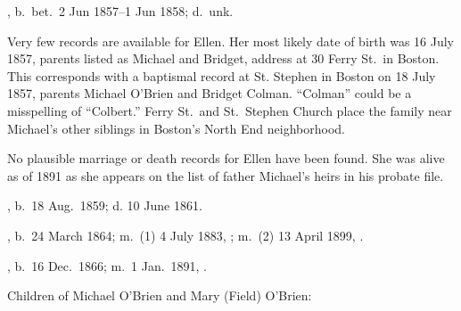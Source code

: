\begin{Kids}
	
	, b.\ bet.\ 2 Jun 1857--1 Jun 1858;\cite{Census1870Ellen3OBrien2,Census1880Ellen3OBrien2} d.\ unk.
	
	\begin{KidsMoreText}
		Very few records are available for Ellen. Her most likely date of birth was 16 July 1857, parents listed as Michael and Bridget, address at 30 Ferry St.\ in Boston.\cite{Ellen3OBrien2Birth} This corresponds with a baptismal record at St. Stephen in Boston on 18 July 1857, parents Michael O'Brien and Bridget Colman.\cite{Ellen3OBrien2Baptism} ``Colman'' could be a misspelling of ``Colbert.'' Ferry St.\ and St.\ Stephen Church place the family near Michael's other siblings in Boston's North End neighborhood.\cite{Boston1861Map}
		
		No plausible marriage or death records for Ellen have been found. She was alive as of 1891 as she appears on the list of father Michael's heirs in his probate file.\cite{Michael2OBrienProbate}
	\end{KidsMoreText}
	
	, b.\ 18 Aug.\ 1859;\cite{MaryAnn3OBrien2Birth} d. 10 June 1861.\cite{MaryAnn3OBrien2Death}
	
	, b.\ 24 March 1864; m.\ (1) 4 July 1883, ; m.\ (2) 13 April 1899, .
	
	, b.\ 16 Dec.\ 1866; m.\ 1 Jan.\ 1891, .
	
\end{Kids}

\begin{KidsIntro}
	Children of Michael O'Brien and Mary (Field) O'Brien:
\end{KidsIntro}

